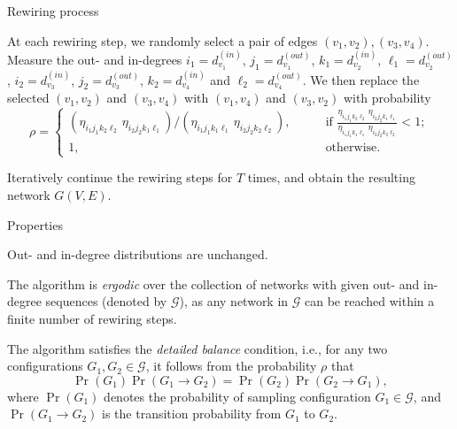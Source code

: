 \documentclass[xcolor=dvipsnames, compress, 10pt]{beamer}
\theoremstyle{remark}
\newcommand{\dout}{d^{(in)}}
\newcommand{\din}{d^{(out)}}
\begin{document}
\begin{frame}{Rewiring process}
	
At each 
rewiring step, we randomly select a pair of edges
$(v_1, v_2), (v_3, v_4)$. Measure the out- and in-degrees 
$i_1 = \dout_{v_1}$, $j_1 = \din_{v_1}$, 
$k_1 = \dout_{v_2}$, $\ell_1 = \din_{v_2}$, 
$i_2 = \dout_{v_3}$, $j_2 = \din_{v_3}$, 
$k_2 = \dout_{v_4}$ and $\ell_2 = \din_{v_4}$.
We then replace the selected $(v_1, v_2)$ and $(v_3, v_4)$ with
$(v_1, v_4)$ and $(v_3, v_2)$ with probability
\begin{equation*}
   \rho = \begin{cases}
   	\left(\eta_{i_1 j_1 k_2 \ell_2}\, \eta_{i_2 j_2 k_1 \ell_1}\right)/
    \left(\eta_{i_1 j_1 k_1 \ell_1}\, \eta_{i_2 j_2 k_2 \ell_2}\right), 
    &\qquad \text{if }
    \frac{\eta_{i_1 j_1 k_2 \ell_2}\, \eta_{i_2 j_2 k_1 \ell_1}}
	{\eta_{i_1 j_1 k_1 \ell_1}\, \eta_{i_2 j_2 k_2 \ell_2}} < 1;
    \\ 1, &\qquad \text{otherwise}.
    \end{cases}
\end{equation*} 

\vspace{0.2cm}

Iteratively continue the rewiring steps for $T$ times, and obtain the resulting
network $G(V, E)$.

\end{frame}


\begin{frame}{Properties}

Out- and in-degree distributions are unchanged.

\vspace{0.2cm}

The algorithm is \emph{ergodic} over the 
collection of networks with given out- and in-degree sequences 
(denoted by $\mathcal{G}$), as any network in $\mathcal{G}$ can be 
reached within a finite number of rewiring steps. 

\vspace{0.2cm}

The algorithm satisfies the \emph{detailed balance} condition, 
i.e., for any 
two configurations $G_1, G_2 
\in \mathcal{G}$, it follows from the probability $\rho$ that 
\[
\Pr(G_1) \Pr(G_1 \to G_2) = \Pr(G_2) \Pr(G_2 \to G_1),
\]
where $\Pr(G_1)$ denotes the probability of sampling configuration 
$G_1 \in \mathcal{G}$, and $\Pr(G_1 \to G_2)$ is the transition 
probability from $G_1$ to $G_2$. 

\end{frame}
\end{document}

